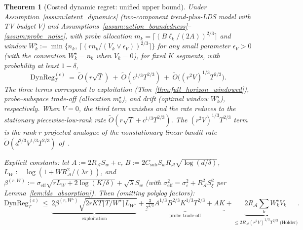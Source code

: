 \documentclass[11pt]{article}
\newcommand{\cA}{\mathcal{A}}
\newcommand{\DynReg}{\mathrm{DynReg}}
\newtheorem{theorem}{Theorem}
\begin{document}
\begin{theorem}[Costed dynamic regret: unified upper bound]
\label{thm:closed_dynamic_regret}
Under Assumption~\ref{assum:latent_dynamics} (two-component trend-plus-LDS model
with TV budget $V$) and Assumptions~\ref{assum:action_boundedness}--\ref{assum:probe_noise},
with probe allocation $m_k=\lceil(B\ell_k/(2A))^{2/3}\rceil$ and window
$W_k^\star:=\min\!\bigl\{n_k,\,\lceil(rn_k/(V_k\vee\epsilon_V))^{2/3}\rceil\bigr\}$
for any small parameter $\epsilon_V>0$ (with the convention $W_k^\star=n_k$ when
$V_k=0$), for fixed $K$ segments, with probability at least $1-\delta$,
\begin{equation}
\boxed{\;
\DynReg_T^{(c)}
\ =\ \widetilde O(r\sqrt{T})
\ +\ \widetilde O(c^{1/3}T^{2/3})
\ +\ \widetilde O\!\bigl((r^{2}V)^{1/3}T^{2/3}\bigr).
\;}
\label{eq:closed_bound}
\end{equation}
The three terms correspond to \emph{exploitation} (Thm~\ref{thm:full_horizon_windowed}),
\emph{probe--subspace trade-off} (allocation $m_k^\star$), and \emph{drift}
(optimal window $W_k^\star$), respectively.  When $V=0$, the third term
vanishes and the rate reduces to the stationary piecewise-low-rank rate
$\widetilde O(r\sqrt T+c^{1/3}T^{2/3})$.  The $(r^{2}V)^{1/3}T^{2/3}$ term is
the rank-$r$ projected analogue of the nonstationary linear-bandit rate
$\widetilde O(d^{2/3}V^{1/3}T^{2/3})$ of~\citet{russac2019weighted,cheung2019learning}.

Explicit constants:
let $A:=2R_{\cA}S_w+c$, $B:=2C_{\mathrm{sub}}S_wR_{\cA}\sqrt{\log(d/\delta)}$,
$L_W:=\log(1+WR_{\cA}^2/(\lambda r))$, and
$\beta^{(r,W)}:=\sigma_{\mathrm{eff}}\sqrt{rL_W+2\log(K/\delta)}+\sqrt{\lambda}S_w$
(with $\sigma_{\mathrm{eff}}^2=\sigma_\varepsilon^2+R_\cA^2 S_\xi^2$ per
Lemma~\ref{lem:lds_absorption}).  Then (omitting polylog factors):
\begin{equation}
\DynReg_T^{(c)}\ \le\
\underbrace{2\beta^{(r,W^\star)}\sqrt{2rK T\lceil T/W^\star\rceil L_{W^\star}}}_{\text{exploitation}}
+\underbrace{\tfrac{3}{2^{2/3}}A^{1/3}B^{2/3}K^{1/3}T^{2/3}+AK}_{\text{probe trade-off}}
+\underbrace{2R_\cA\sum_k W_k^\star V_k}_{\le 2R_\cA(r^2V)^{1/3}T^{2/3}\text{ (H\"older)}}.
\label{eq:closed_bound_final}
\end{equation}
\end{theorem}
\end{document}
